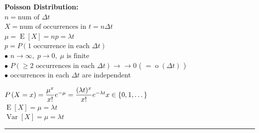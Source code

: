 \documentclass[11pt, a4paper]{article}
\newcommand{\myP}[1]{P\left(#1\right)}
\newcommand{\myPMF}[2][X]{\myP{#1 = #2}}
\newcommand{\myExpect}[1]{\operatorname{E}\left[#1\right]}
\newcommand{\myVariance}[1]{\operatorname{Var}\left[#1\right]}
\newcommand{\myLittleO}[1]{\operatorname{o}\left(#1\right)}
\begin{document}
\noindent
\begin{minipage}[t]{0.52\textwidth}
    \textbf{Poisson Distribution:} \\[2pt]
    $n = \text{num of } \Delta t$ \\
    $X = \text{num of occurrences in } t = n \Delta t$ \\
    $\mu = \myExpect{X} = np = \lambda t$ \\
    $p = \myP{1 \text{ occurrence in each } \Delta t}$ \\
    $\bullet$ $n \to \infty, \; p \to 0, \; \mu \text{ is finite}$ \\[2pt]
    $\bullet$ $\myP{\ge 2 \text{ occurrences in each } \Delta t} \to\to 0$ ( $=\myLittleO{\Delta t}$ ) \\
    $\bullet$ occurrences in each $\Delta t$ are independent
\end{minipage}%
\hfill
\begin{minipage}[t]{0.45\textwidth}
    $\myPMF{x} = \dfrac{\mu^x}{x!} e^{-\mu} = \dfrac{ (\lambda t)^x }{ x! } e^{-\lambda t} \\
    {} \hfill x \in \{0, 1, \dots\}$ \\
    $\myExpect{X} = \mu = \lambda t$ \\[4pt]
    $\myVariance{X} = \mu = \lambda t$
\end{minipage}

\vspace{6pt}
\hrule
\vspace{6pt}
\end{document}
